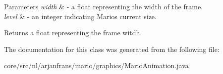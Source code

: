\begin{DoxyParams}{Parameters}
{\em width} & -\/ a float representing the width of the frame. \\
\hline
{\em level} & -\/ an integer indicating Mario\textquotesingle{}s current size. \\
\hline
\end{DoxyParams}
\begin{DoxyReturn}{Returns}
a float representing the frame witdh. 
\end{DoxyReturn}


The documentation for this class was generated from the following file\+:\begin{DoxyCompactItemize}
\item 
core/src/nl/arjanfrans/mario/graphics/Mario\+Animation.\+java\end{DoxyCompactItemize}
